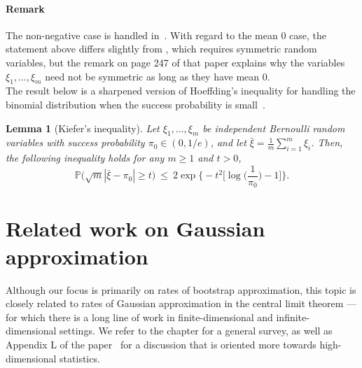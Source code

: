 \documentclass[aos,preprint]{imsart}
\numberwithin{equation}{section}
\theoremstyle{plain}
\newtheorem{lemma}{Lemma}[section]
\renewcommand{\P}{\mathbb{P}}
\newcommand{\ts}{\textstyle}
\newcommand{\1}{{\bf{1}}}
\newcommand{\0}{\mathbf{0}}
\begin{document}
\paragraph{Remark} The non-negative case is handled in~\cite[Theorem 2.5]{Zinn:1985}.  With regard to the mean 0 case, the statement above differs slightly from \cite[Theorem 4.1]{Zinn:1985}, which requires symmetric random variables, but the 
 remark on page 247 of that paper explains why the variables $\xi_1,\dots,\xi_m$ need not be symmetric as long as they have mean 0.\\

The result below is a sharpened version of Hoeffding's inequality for handling the binomial distribution when the success probability is small~\citep[Corollary A.6.3]{vanderVaart:Wellner:2000}.
\begin{lemma}[Kiefer's inequality]\label{lem:Kiefer}
Let $\xi_1,\dots,\xi_m$ be independent Bernoulli random variables with success probability $\pi_0\in(0,1/e)$, and let $\bar\xi=\frac{1}{m}\sum_{i=1}^m\xi_i$. Then, the following inequality holds for any $m\geq 1$ and $t>0$,
\begin{equation}
\P\Big(\sqrt{m}|\bar\xi-\pi_0|\geq t\Big) \ \leq \ 2\exp\Big\{-t^2\big[\log\big(\ts\frac{1}{\pi_0}\big)-1\big]\Big\}.
\end{equation}
\end{lemma}




\section{Related work on Gaussian approximation}\label{app:Gaussian}

Although our focus is primarily on rates of bootstrap approximation, this topic is closely related to rates of Gaussian approximation in the central limit theorem --- for which there is a long line of work in finite-dimensional and infinite-dimensional settings. We refer to the chapter \citep{Bentkus:2000} for a general survey, as well as Appendix L of the paper~\citep{CCK:2013} for a discussion that is oriented more towards high-dimensional statistics.
\end{document}
